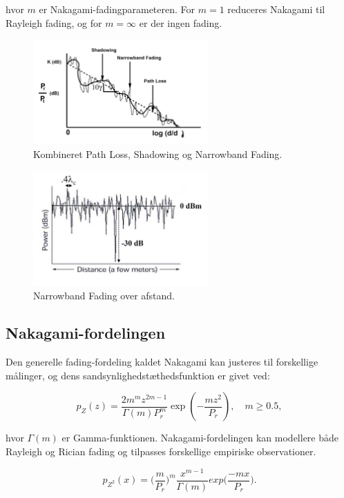 \documentclass[a4paper,12pt]{book}
\begin{document}
	hvor $m$ er Nakagami-fadingparameteren. For $m = 1$ reduceres Nakagami til Rayleigh fading, og for $m = \infty$ er der ingen fading.
	
	\begin{figure}[h!]
		\centering
		\includegraphics[width=0.6\textwidth]{fig/fig23.png}
		\caption{Kombineret Path Loss, Shadowing og Narrowband Fading.}
	\end{figure}
	
	\begin{figure}[h!]
		\centering
		\includegraphics[width=0.6\textwidth]{fig/fig24.png}
		\caption{Narrowband Fading over afstand.}
	\end{figure}
	
	\subsection{Nakagami-fordelingen}
	Den generelle fading-fordeling kaldet Nakagami kan justeres til forskellige målinger, og dens sandsynlighedstæthedsfunktion er givet ved:
	
	\[
	p_Z(z) = \frac{2m^m z^{2m-1}}{\Gamma(m) P_r^m} \exp\left(- \frac{mz^2}{P_r}\right), \quad m \geq 0.5,
	\]
	
	hvor $\Gamma(m)$ er Gamma-funktionen. Nakagami-fordelingen kan modellere både Rayleigh og Rician fading og tilpasses forskellige empiriske observationer.
	
	\[
	p_{Z^2}(x) = \bigg(\frac{m}{P_r}\bigg)^m\frac{x^{m-1}}{\Gamma(m)}exp\bigg(\frac{-mx}{P_r}\bigg).
	\]
	
\end{document}
